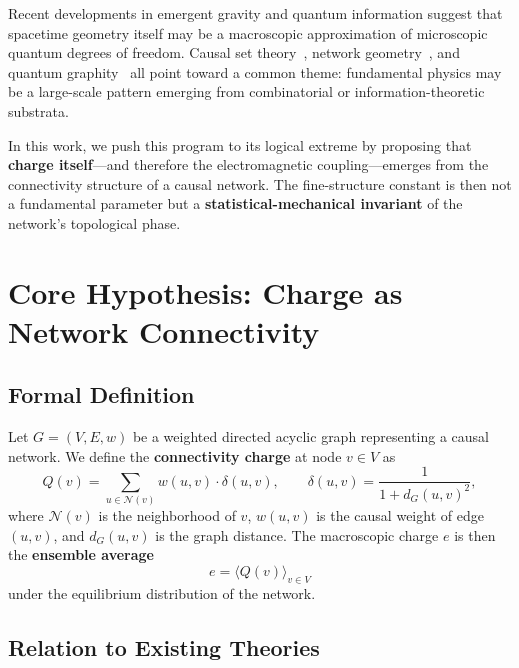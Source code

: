\documentclass[11pt,a4paper]{article}
\theoremstyle{definition}
\theoremstyle{remark}
\begin{document}
Recent developments in emergent gravity and quantum information suggest that
spacetime geometry itself may be a macroscopic approximation of microscopic
quantum degrees of freedom. Causal set theory~\cite{Sorkin2005}, network
geometry~\cite{Bianconi2016}, and quantum graphity~\cite{Konopka2008} all point
toward a common theme: fundamental physics may be a large-scale pattern emerging
from combinatorial or information-theoretic substrata.

In this work, we push this program to its logical extreme by proposing that
\textbf{charge itself}---and therefore the electromagnetic coupling---emerges
from the connectivity structure of a causal network. The fine-structure constant
is then not a fundamental parameter but a \textbf{statistical-mechanical
invariant} of the network's topological phase.

\section{Core Hypothesis: Charge as Network Connectivity}\label{sec:hypothesis}

\subsection{Formal Definition}\label{subsec:formal}

Let $G = (V, E, w)$ be a weighted directed acyclic graph representing a causal
network. We define the \textbf{connectivity charge} at node $v \in V$ as
\begin{equation}\label{eq:Qv}
Q(v) = \sum_{u \in \mathcal{N}(v)} w(u,v) \cdot \delta(u,v),
\qquad
\delta(u,v) = \frac{1}{1 + d_{G}(u,v)^{2}},
\end{equation}
where $\mathcal{N}(v)$ is the neighborhood of $v$, $w(u,v)$ is the causal
weight of edge $(u,v)$, and $d_{G}(u,v)$ is the graph distance. The macroscopic
charge $e$ is then the \textbf{ensemble average}
\begin{equation}\label{eq:ensemble}
e = \langle Q(v) \rangle_{v \in V}
\end{equation}
under the equilibrium distribution of the network.

\subsection{Relation to Existing Theories}\label{subsec:relation}
\end{document}
